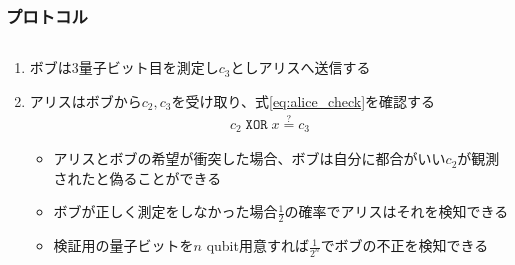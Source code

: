 \begin{frame}
  \frametitle{プロトコル}

  \begin{columns}
    \begin{column}{0.5\textwidth}
    \end{column}
    \begin{column}{0.5\textwidth}
    \end{column}
  \end{columns}

  \begin{enumerate}
    \item ボブは3量子ビット目を測定し$c_3$としアリスへ送信する

    \item アリスはボブから$c_2, c_3$を受け取り、式\ref{eq:alice_check}を確認する
    \begin{align}
      c_2\; \mathtt{XOR}\; x \stackrel{?}{=} c_3 \label{eq:alice_check}
    \end{align}

    \begin{itemize}
      \item アリスとボブの希望が衝突した場合、ボブは自分に都合がいい$c_2$が観測されたと偽ることができる

      \item ボブが正しく測定をしなかった場合$\frac{1}{2}$の確率でアリスはそれを検知できる

      \item 検証用の量子ビットを$n$ qubit用意すれば$\frac{1}{2^n}$でボブの不正を検知できる
    \end{itemize}
  \end{enumerate}
\end{frame}


